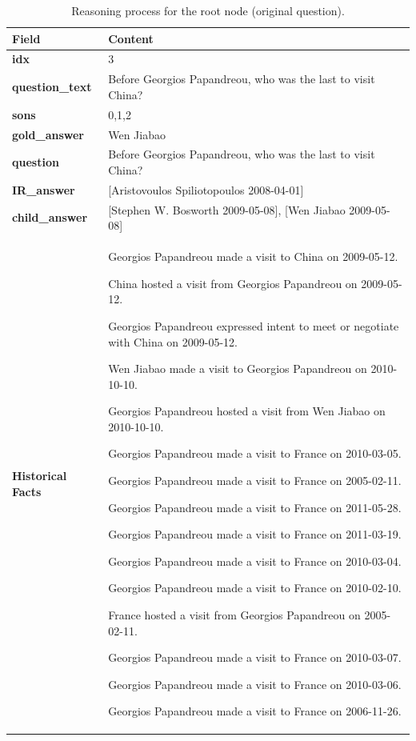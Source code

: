 \documentclass[11pt]{article}
\begin{document}
\begin{table}[h]
\caption{Reasoning process for the root node (original question).}
\label{tab:example-sub4}
\centering
\small
\begin{tabular}{p{} p{}}
\toprule
\textbf{Field} & \textbf{Content} \\
\midrule
\textbf{idx} & 3 \\
\textbf{question\_text} & Before Georgios Papandreou, who was the last to visit China? \\
\textbf{sons} & 0,1,2 \\
\textbf{gold\_answer} & Wen Jiabao \\
\textbf{question} & Before Georgios Papandreou, who was the last to visit China? \\
\textbf{IR\_answer} & [Aristovoulos Spiliotopoulos 2008-04-01] \\
\textbf{child\_answer} & [Stephen W. Bosworth 2009-05-08], [Wen Jiabao 2009-05-08] \\
\midrule
\textbf{Historical Facts} &
Georgios Papandreou made a visit to China on 2009-05-12. \par
China hosted a visit from Georgios Papandreou on 2009-05-12. \par
Georgios Papandreou expressed intent to meet or negotiate with China on 2009-05-12. \par
Wen Jiabao made a visit to Georgios Papandreou on 2010-10-10. \par
Georgios Papandreou hosted a visit from Wen Jiabao on 2010-10-10. \par
Georgios Papandreou made a visit to France on 2010-03-05. \par
Georgios Papandreou made a visit to France on 2005-02-11. \par
Georgios Papandreou made a visit to France on 2011-05-28. \par
Georgios Papandreou made a visit to France on 2011-03-19. \par
Georgios Papandreou made a visit to France on 2010-03-04. \par
Georgios Papandreou made a visit to France on 2010-02-10. \par
France hosted a visit from Georgios Papandreou on 2005-02-11. \par
Georgios Papandreou made a visit to France on 2010-03-07. \par
Georgios Papandreou made a visit to France on 2010-03-06. \par
Georgios Papandreou made a visit to France on 2006-11-26. \par

\end{tabular}
\end{table}
\end{document}
